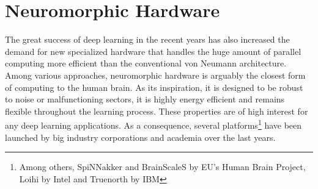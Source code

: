 \section{Neuromorphic Hardware}

The great success of deep learning in the recent years has also increased the demand for new specialized hardware that handles the huge amount of parallel computing more efficient than the conventional von Neumann architecture. Among various approaches, neuromorphic hardware is arguably the closest form of computing to the human brain. As its inspiration, it is designed to be robust to noise or malfunctioning sectors, it is highly energy efficient and remains flexible throughout the learning process. These properties are of high interest for any deep learning applications. As a consequence, several platforms\footnote{Among others, SpiNNakker and BrainScaleS by EU's Human Brain Project, Loihi by Intel and Truenorth by IBM} have been launched by big industry corporations and academia over the last years.
 
